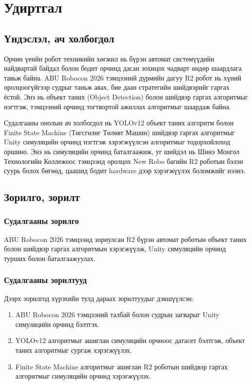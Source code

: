 \chapter{Удиртгал}
\label{ch:introduction}

\section{Үндэслэл, ач холбогдол}

Орчин үеийн робот техникийн хөгжил нь бүрэн автомат системүүдийн найдвартай байдал болон бодит орчинд дасан зохицох чадварт өндөр шаардлага тавьж байна. ABU Robocon 2026 тэмцээний дүрмийн дагуу R2 робот нь хүний оролцоогүйгээр судрыг таньж авах, бие даан стратегийн шийдвэрийг гаргах ёстой. Энэ нь объект таних (Object Detection) болон шийдвэр гаргах алгоритмыг нэгтгэж, тэмцээний орчинд тогтвортой ажиллах алгоритмыг шаардаж байна.

Судалгааны онолын ач холбогдол нь YOLOv12 объект таних алгоритм болон Finite State Machine (Төгсгөлөг Төлөвт Машин) шийдвэр гаргах алгоритмыг Unity симуляцийн орчинд нэгтгэж хэрэгжүүлсэн алгоритмыг тодорхойлоход оршино. Энэ нь симуляцийн орчинд баталгаажиж, уг шийдэл нь Шинэ Монгол Технологийн Коллежоос тэмцээнд оролцох New Robo багийн R2 роботын бэлэн суурь болох бөгөөд, цаашид бодит hardware дээр хэрэгжүүлэх боломжийг нээнэ.

\section{Зорилго, зорилт}

\subsection{Судалгааны зорилго}

ABU Robocon 2026 тэмцээнд зориулсан R2 бүрэн автомат роботын объект таних болон шийдвэр гаргах алгоритмын хэрэгжүүлж, Unity симуляцийн орчинд турших болон баталгаажуулах.

\subsection{Судалгааны зорилтууд}

Дээрх зорилгод хүрэхийн тулд дараах зорилтуудыг дэвшүүлсэн:

\begin{enumerate}
    \item ABU Robocon 2026 тэмцээний талбай болон судрын загварыг Unity симуляцийн орчинд бэлтгэх.
    \item YOLOv12 алгоритмыг ашиглан симуляцийн орчноос датасет бэлтгэж, объект таних алгоритмыг сургаж хэрэгжүүлэх.
    \item Finite State Machine алгоритмыг ашиглан R2 роботын шийдвэр гаргах алгоритмыг симуляцийн орчинд хэрэгжүүлэх.
\end{enumerate}
